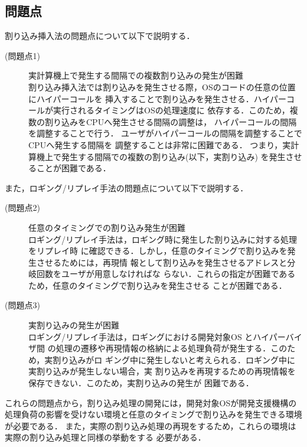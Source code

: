 \documentclass[submit,techreq,noauthor,dvipdfmx]{ipsj}
\begin{document}
\subsection{問題点}\label{sec:problem}

割り込み挿入法の問題点について以下で説明する．

\begin{description}
    \item[(問題点1)]実計算機上で発生する間隔での複数割り込みの発生が困難\\
        割り込み挿入法では割り込みを発生させる際，OSのコードの任意の位置にハイパーコールを
        挿入することで割り込みを発生させる．ハイパーコールが実行されるタイミングはOSの処理速度に
        依存する．このため，複数の割り込みをCPUへ発生させる間隔の調整は，
        ハイパーコールの間隔を調整することで行う．
        ユーザがハイパーコールの間隔を調整することでCPUへ発生する間隔を
        調整することは非常に困難である．
        つまり，実計算機上で発生する間隔での複数の割り込み(以下，実割り込み)
        を発生させることが困難である．
\end{description}

また，ロギング/リプレイ手法の問題点について以下で説明する．

\begin{description}
    \item[(問題点2)]任意のタイミングでの割り込み発生が困難\\
        ロギング/リプレイ手法は，ロギング時に発生した割り込みに対する処理をリプレイ時
        に確認できる．しかし，任意のタイミングで割り込みを発生させるためには，再現情
        報として割り込みを発生させるアドレスと分岐回数をユーザが用意しなければな
        らない．これらの指定が困難であるため，任意のタイミングで割り込みを発生させる
        ことが困難である．
    \item[(問題点3)]実割り込みの発生が困難\\
        ロギング/リプレイ手法は，ロギングにおける開発対象OS とハイパーバイザ間
        の処理の遷移や再現情報の格納による処理負荷が発生する．このため，実割り込みがロ
        ギング中に発生しないと考えられる．ロギング中に実割り込みが発生しない場合，実
        割り込みを再現するための再現情報を保存できない．このため，実割り込みの発生が
        困難である．
\end{description}

これらの問題点から，割り込み処理の開発には，開発対象OSが開発支援機構の
処理負荷の影響を受けない環境と任意のタイミングで割り込みを発生できる環境が必要である．
また，実際の割り込み処理の再現をするため，これらの環境は実際の割り込み処理と同様の挙動をする
必要がある．
\end{document}
